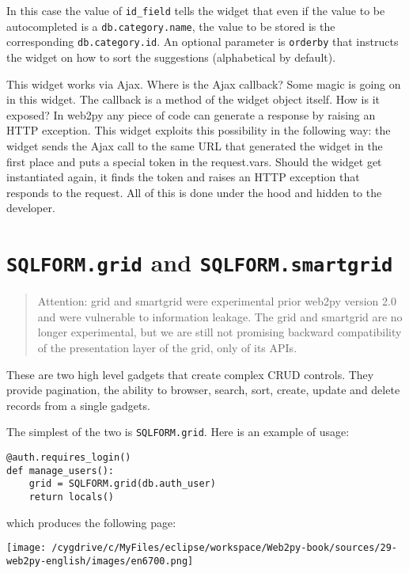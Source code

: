 \documentclass[justified,sixbynine,notoc]{tufte-book}
\def\ft{\small\tt}
\begin{document}
\begin{fullwidth}
In this case the value of {\ft id\_field} tells the widget that even if the value to be autocompleted is a {\ft db.category.name}, the value to be stored is the corresponding {\ft db.category.id}. An optional parameter is {\ft orderby} that instructs the widget on how to sort the suggestions (alphabetical by default).

This widget works via Ajax. Where is the Ajax callback? Some magic is going on in this widget. The callback is a method of the widget object itself. How is it exposed? In web2py any piece of code can generate a response by raising an HTTP exception. This widget exploits this possibility in the following way: the widget sends the Ajax call to the same URL that generated the widget in the first place and puts a special token in the request.vars. Should the widget get instantiated again, it finds the token and raises an HTTP exception that responds to the request. All of this is done under the hood and hidden to the developer.

\goodbreak\section{{\ft SQLFORM.grid} and {\ft SQLFORM.smartgrid}}

\begin{quote}Attention: grid and smartgrid were experimental prior web2py version 2.0 and were vulnerable to information leakage. The grid and smartgrid are no longer experimental, but we are still not promising backward compatibility of the presentation layer of the grid, only of its APIs.\end{quote}
These are two high level gadgets that create complex CRUD controls. They provide pagination, the ability to browser, search, sort, create, update and delete records from a single gadgets.

The simplest of the two is {\ft SQLFORM.grid}. Here is an example of usage:

\begin{lstlisting}
@auth.requires_login()
def manage_users():
    grid = SQLFORM.grid(db.auth_user)
    return locals()
\end{lstlisting}
\noindent which produces the following page:


\goodbreak\begin{center}\texttt{[image: /cygdrive/c/MyFiles/eclipse/workspace/Web2py-book/sources/29-web2py-english/images/en6700.png]}\end{center}



\end{fullwidth}
\end{document}
